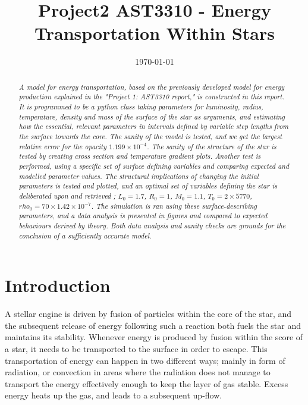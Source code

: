 \documentclass[10pt, nofootinbib, twocolumn]{revtex4-1}
\begin{document}
\vspace*{2\baselineskip}
\title{Project2 AST3310 - Energy Transportation Within Stars} 
\date{\today}        
\begin{abstract}
    \textit{A model for energy transportation, based on the previously developed model for energy production explained in the "Project 1: AST3310 report," is constructed in this report. It is programmed to be a python class taking parameters for luminosity, radius, temperature, density and mass of the surface of the star as arguments, and estimating how the essential, relevant parameters in intervals defined by variable step lengths from the surface towards the core. The sanity of the model is tested, and we get the largest relative error for the opacity $1.199\times 10^{-4}$. The sanity of the structure of the star is tested by creating cross section and temperature gradient plots. Another test is performed, using a specific set of surface defining variables and comparing expected and modelled parameter values. The structural implications of changing the initial parameters is tested and plotted, and an optimal set of variables defining the star is deliberated upon and retrieved ; $L_0=1.7$, $R_0=1$, $M_0=1.1$, $T_0=2\times5770$, $rho_0=70\times1.42\times 10^{-7}$. The simulation is ran using these surface-describing parameters, and a data analysis is presented in figures and compared to expected behaviours derived by theory. Both data analysis and sanity checks are grounds for the conclusion of a sufficiently accurate model.}
\end{abstract}
\maketitle       

\section{Introduction}\label{sec:introduction}
A stellar engine is driven by fusion of particles within the core of the star, and the subsequent release of energy following such a reaction both fuels the star and maintains its stability. Whenever energy is produced by fusion within the score of a star, it needs to be transported to the surface in order to escape. This transportation of energy can happen in two different ways; mainly in form of radiation, or convection in areas where the radiation does not manage to transport the energy effectively enough to keep the layer of gas stable. Excess energy heats up the gas, and leads to a subsequent up-flow. 
\\
\end{document}
